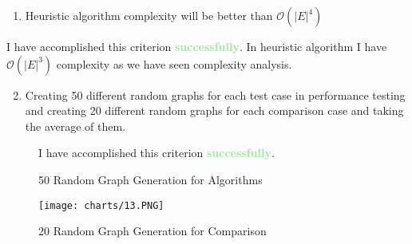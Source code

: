 \documentclass{beamer}
\begin{document}
\begin{projectsuccess}
\begin{enumerate}
\item Heuristic algorithm complexity will be better than $\mathcal{O}(|E|^4)$ 
\end{enumerate}
\vspace{0.03\textheight}
I have accomplished this criterion \textcolor{lightgreen}{\textbf{successfully}}. In heuristic algorithm I have $\mathcal{O}(|E|^3)$ complexity as we have seen complexity analysis. 
\end{projectsuccess}

\begin{projectsuccess}
\begin{enumerate}
\setcounter{enumi}{1}
\item Creating 50 different random graphs for each test case in performance testing and creating 20 different random graphs for each comparison case and taking the average of them.
\end{enumerate}
\begin{figure}[H]
I have accomplished this criterion \textcolor{lightgreen}{\textbf{successfully}}.
    \centering
    \caption{50 Random Graph Generation for Algorithms}
    \label{fig:ent5}
\end{figure}
\end{projectsuccess}

\begin{projectsuccess}
\begin{figure}[!htbp]
    \centering
    \texttt{[image: charts/13.PNG]}
    \caption{\label{fig:logo}20 Random Graph Generation for Comparison}
\end{figure}
\end{projectsuccess}
\end{document}
